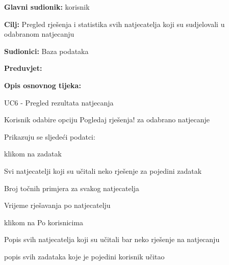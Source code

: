 					\noindent {}
					\begin{packed_item}
						
						\item \textbf{Glavni sudionik: }korisnik
						\item  \textbf{Cilj:} Pregled rješenja i statistika svih natjecatelja koji su sudjelovali u odabranom natjecanju
						\item  \textbf{Sudionici:} Baza podataka
						\item  \textbf{Preduvjet:} 
						\item  \textbf{Opis osnovnog tijeka:}
						
						\item[] \begin{packed_enum}
							
							\item UC6 - Pregled rezultata natjecanja
							\item Korisnik odabire opciju Pogledaj rješenja! za odabrano natjecanje
							\item Prikazuju se sljedeći podatci:
							 \item[] \begin{packed_enum}
							 	\item klikom na zadatak
							 	 \item[] \begin{packed_enum}
							 	 	\item Svi natjecatelji koji su učitali neko rješenje za pojedini zadatak
							 	 	\item Broj točnih primjera za svakog natjecatelja
							 	 	\item Vrijeme rješavanja po natjecatelju
							 	 	\end{packed_enum}
							 	 \item klikom na Po korisnicima
							 	 \item[] \begin{packed_enum}
							 	 	\item Popis svih natjecatelja koji su učitali bar neko rješenje na natjecanju
							 	 	\item popis svih zadataka koje je pojedini korisnik učitao
							 	 \end{packed_enum}
							 \end{packed_enum}
						\end{packed_enum}
					\end{packed_item}


